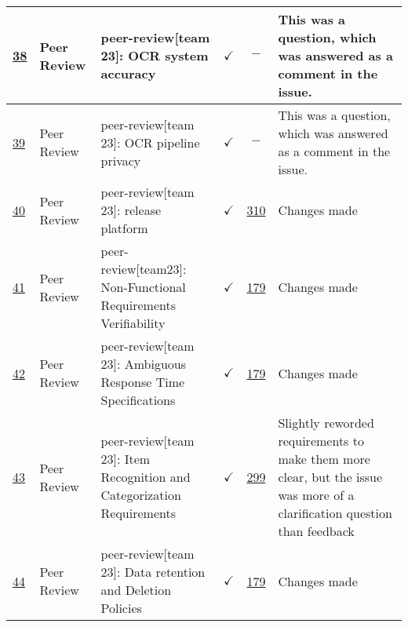 \documentclass{article}
\begin{document}
\begin{table}[H]
{\begin{tabular}{p{1.5cm} p{2cm} p{3.5cm} c c p{4cm}}
        \href{https://github.com/PlutosCapstone/Plutos/issues/38}{38} & Peer
        Review & peer-review[team 23]: OCR system accuracy & $\checkmark$ & $-$
        & This was a question, which was answered as a comment in the issue.  \\ \hline
        \href{https://github.com/PlutosCapstone/Plutos/issues/39}{39} & Peer
        Review & peer-review[team 23]: OCR pipeline privacy & $\checkmark$ & $-$ &
        This was a question, which was answered as a comment in the issue.  \\ \hline
        \href{https://github.com/PlutosCapstone/Plutos/issues/40}{40} & Peer
        Review & peer-review[team 23]: release platform & $\checkmark$
        & \href{https://github.com/PlutosCapstone/Plutos/pull/310}{310} & Changes made \\ \hline
        \href{https://github.com/PlutosCapstone/Plutos/issues/41}{41} & Peer
        Review & peer-review[team23]: Non-Functional Requirements Verifiability
        & $\checkmark$ & \href{https://github.com/PlutosCapstone/Plutos/pull/179}{179} &
        Changes made  \\ \hline
        \href{https://github.com/PlutosCapstone/Plutos/issues/42}{42} & Peer
        Review & peer-review[team 23]: Ambiguous Response Time Specifications  &
        $\checkmark$ &
        \href{https://github.com/PlutosCapstone/Plutos/pull/179}{179} & Changes
        made  \\ \hline
        \href{https://github.com/PlutosCapstone/Plutos/issues/43}{43} & Peer
        Review & peer-review[team 23]: Item Recognition and Categorization
        Requirements  & $\checkmark$ &
        \href{https://github.com/PlutosCapstone/Plutos/pull/299}{299} & Slightly
        reworded requirements to make them more clear, but the issue was more of
        a clarification question than feedback \\ \hline
        \href{https://github.com/PlutosCapstone/Plutos/issues/44}{44} & Peer
        Review & peer-review[team 23]: Data retention and Deletion Policies  & $\checkmark$ &
        \href{https://github.com/PlutosCapstone/Plutos/pull/179}{179} & Changes
        made \\
    \bottomrule
    \end{tabular}%
    }
\end{table}
\end{document}

